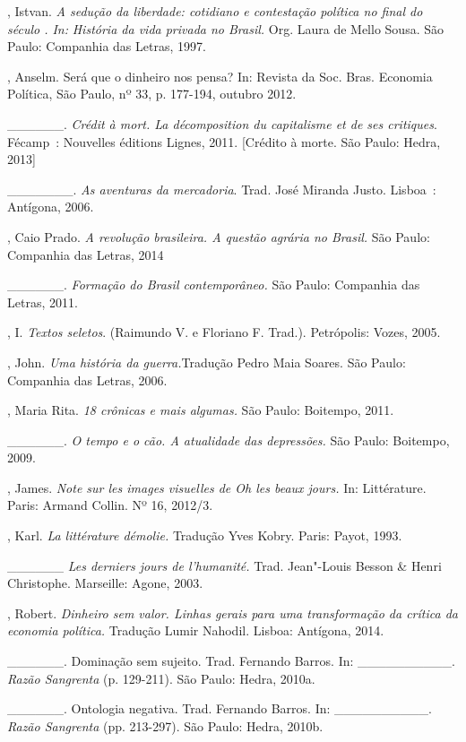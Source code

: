 {\begin{Parskip}
, Istvan. \emph{A sedução da liberdade: cotidiano e contestação
política no final do século . In:} \emph{História da vida privada
no Brasil.} Org. Laura de Mello Sousa. São Paulo: Companhia das Letras,
1997.

, Anselm. Será que o dinheiro nos pensa? In: Revista da Soc. Bras.
Economia Política, São Paulo, nº 33, p. 177-194, outubro 2012.

\_\_\_\_\_\_. \emph{Crédit à mort. La décomposition du capitalisme et
de ses critiques}. Fécamp~: Nouvelles éditions Lignes, 2011. [Crédito
à morte. São Paulo: Hedra, 2013]

\_\_\_\_\_\_\_. \emph{As aventuras da mercadoria}. Trad. José
Miranda Justo. Lisboa~: Antígona, 2006.

, Caio Prado. \emph{A revolução brasileira. A questão agrária no
Brasil.} São Paulo: Companhia das Letras, 2014

\_\_\_\_\_\_. \emph{Formação do Brasil contemporâneo.} São Paulo:
Companhia das Letras, 2011.

, I. \emph{Textos seletos}. (Raimundo V. e Floriano F. Trad.).
Petrópolis: Vozes, 2005.

, John. \emph{Uma história da guerra.}Tradução Pedro Maia
Soares. São Paulo: Companhia das Letras, 2006.

, Maria Rita. \emph{18 crônicas e mais algumas.} São Paulo:
Boitempo, 2011.

\_\_\_\_\_\_. \emph{O tempo e o cão. A atualidade das depressões.} São
Paulo: Boitempo, 2009.

, James. \emph{Note sur les images visuelles de \emph{Oh les
beaux jours}.} In: Littérature. Paris: Armand Collin. Nº 16, 2012/3.

, Karl. \emph{La littérature démolie.} Tradução Yves Kobry.
Paris: Payot, 1993.

\_\_\_\_\_\_ \emph{Les derniers jours de l'humanité.} Trad. Jean"-Louis
Besson \& Henri Christophe. Marseille: Agone, 2003.

, Robert. \emph{Dinheiro sem valor. Linhas gerais para uma
transformação da crítica da economia política.} Tradução Lumir Nahodil.
Lisboa: Antígona, 2014.

\_\_\_\_\_\_. Dominação sem sujeito. Trad. Fernando Barros. In:
\_\_\_\_\_\_\_\_\_\_. \emph{Razão Sangrenta} (p. 129-211). São Paulo:
Hedra, 2010a.

\_\_\_\_\_\_. Ontologia negativa. Trad. Fernando Barros. In:
\_\_\_\_\_\_\_\_\_\_. \emph{Razão Sangrenta} (pp. 213-297). São Paulo:
Hedra, 2010b.


\end{Parskip}}
